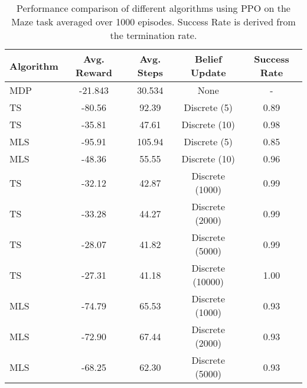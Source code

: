 \begin{table}[h]
    \centering
    \begin{tabular}{lcccc}
    \toprule
    \textbf{Algorithm} & \textbf{Avg. Reward} & \textbf{Avg. Steps} & \textbf{Belief Update} & \textbf{Success Rate}\\
    \midrule
    MDP & -21.843 & 30.534 & None & - \\
    \midrule
        TS & -80.56 & 92.39 & Discrete (5) & 0.89 \\
    TS & -35.81 & 47.61 & Discrete (10) & 0.98 \\
    MLS & -95.91 & 105.94 & Discrete (5) & 0.85 \\
    MLS & -48.36 & 55.55 & Discrete (10) & 0.96 \\
    TS & -32.12 & 42.87 & Discrete (1000) & 0.99 \\
    TS & -33.28 & 44.27 & Discrete (2000) & 0.99 \\
    TS & -28.07 & 41.82 & Discrete (5000) & 0.99 \\
    TS & -27.31 & 41.18 & Discrete (10000) & 1.00 \\
    MLS & -74.79 & 65.53 & Discrete (1000) & 0.93 \\
    MLS & -72.90 & 67.44 & Discrete (2000) & 0.93 \\
    MLS & -68.25 & 62.30 & Discrete (5000) & 0.93 \\
    \midrule
    \bottomrule
    \end{tabular}
    \caption{Performance comparison of different algorithms using PPO on the Maze task averaged over 1000 episodes. Success Rate is derived from the termination rate.}
    \label{tab:maze_results_ppo}
\end{table}
